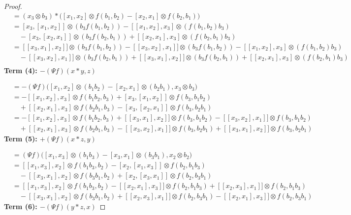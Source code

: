 \documentclass[10pt,a4paper]{amsart}
\begin{document}
\begin{proof}
\begin{align*}
&= (x_3 \otimes b_3) \ast \Big([x_1 , x_2] \otimes f(b_1,b_2) -[x_2, x_1] \otimes f(b_2,b_1)\Big) \\
&= [x_3, [x_1, x_2]] \otimes (b_3  f(b_1,b_2)) - [[x_1, x_2], x_3] \otimes ( f(b_1,b_2)b_3) \\
&\quad - [x_3, [x_2, x_1]] \otimes (b_3  f(b_2,b_1)) + [[x_2, x_1], x_3] \otimes (f(b_2,b_1)b_3)\\
&= [[x_3, x_1], x_2]] \otimes (b_3  f(b_1,b_2))-[[x_3, x_2], x_1]] \otimes (b_3  f(b_1,b_2)) - [[x_1, x_2], x_3] \otimes ( f(b_1,b_2)b_3) \\
&\quad - [[x_3, x_2], x_1]] \otimes (b_3  f(b_2,b_1))+[[x_3, x_1], x_2]] \otimes (b_3  f(b_2,b_1)) + [[x_2, x_1], x_3] \otimes (f(b_2,b_1)b_3)\\
\end{align*}
\textbf{Term (4): $-(\Psi f)(x \ast y, z)$}

\begin{align*}
&= -(\Psi f)\Big([x_1, x_2] \otimes (b_1 b_2) - [x_2, x_1] \otimes (b_2 b_1), x_3 \otimes b_3\Big) \\
&= - [[x_1, x_2], x_3] \otimes f( b_1 b_2, b_3) + [x_3, [x_1, x_2]] \otimes f(b_3,b_1 b_2) \\
&\quad + [[x_2, x_1], x_3] \otimes f(b_2 b_1, b_3) -[x_3, [x_2, x_1]] \otimes f( b_3,b_2  b_1)\\
&= - [[x_1, x_2], x_3] \otimes f( b_1 b_2, b_3) + [[x_3, x_1], x_2]] \otimes f(b_3,b_1 b_2)-[[x_3, x_2], x_1]] \otimes f(b_3,b_1 b_2) \\
&\quad + [[x_2, x_1], x_3] \otimes f(b_2 b_1, b_3) -[[x_3, x_2], x_1]] \otimes f( b_3,b_2  b_1)+[[x_3, x_1], x_2]] \otimes f( b_3,b_2  b_1)
\end{align*}
\textbf{Term (5): $+(\Psi f)(x \ast z, y)$}

\begin{align*}
&= (\Psi f)\Big([x_1, x_3] \otimes (b_1 b_3) - [x_3, x_1] \otimes (b_3 b_1), x_2 \otimes b_2\Big) \\
&=  [[x_1, x_3], x_2] \otimes f( b_1 b_3, b_2) - [x_2, [x_1, x_3]] \otimes f(b_2,b_1 b_3) \\
&\quad - [[x_3, x_1], x_2] \otimes f(b_3 b_1, b_2) +[x_2, [x_3, x_1]] \otimes f( b_2,b_3  b_1)\\
&=  [[x_1, x_3], x_2] \otimes f( b_1 b_3, b_2) - [[x_2, x_1], x_3]] \otimes f(b_2,b_1 b_3)+[[x_2, x_3], x_1]] \otimes f(b_2,b_1 b_3) \\
&\quad - [[x_3, x_1], x_2] \otimes f(b_3 b_1, b_2) +[[x_2, x_3], x_1]] \otimes f( b_2,b_3  b_1)-[[x_2, x_1], x_3]] \otimes f( b_2,b_3  b_1)
\end{align*}
\textbf{Term (6): $-(\Psi f)(y \ast z, x)$}


\end{proof}
\end{document}
